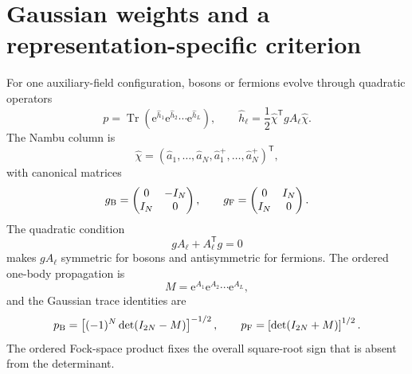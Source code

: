\documentclass[onecolumn,aps,prb,amsmath,amssymb,superscriptaddress,longbibliography]{revtex4-2}
\newcommand{\Tr}{\operatorname{Tr}}
\newcommand{\ee}{\mathrm{e}}
\newcommand{\trans}{\mathsf{T}}
\begin{document}
\section{Gaussian weights and a representation-specific criterion}

For one auxiliary-field configuration, bosons or fermions evolve through
quadratic operators
\begin{equation}
    p=\Tr\!\left(\ee^{\hat h_1}\ee^{\hat h_2}\cdots\ee^{\hat h_L}\right),
    \qquad
    \hat h_\ell=\frac12\hat\chi^\trans gA_\ell\hat\chi .
    \label{eq:configuration_weight}
\end{equation}
The Nambu column is
\begin{equation}
    \hat\chi=(\hat a_1,\ldots,\hat a_N,
    \hat a_1^+,\ldots,\hat a_N^+)^\trans ,
    \label{eq:nambu_column}
\end{equation}
with canonical matrices
\begin{equation}
    g_{\rm B}=\begin{pmatrix}0&-I_N\\ I_N&0\end{pmatrix},
    \qquad
    g_{\rm F}=\begin{pmatrix}0&I_N\\ I_N&0\end{pmatrix}.
    \label{eq:canonical_matrices}
\end{equation}
The quadratic condition
\begin{equation}
    gA_\ell+A_\ell^\trans g=0
    \label{eq:quadratic_condition}
\end{equation}
makes \(gA_\ell\) symmetric for bosons and antisymmetric for fermions.  The
ordered one-body propagation is
\begin{equation}
    M=\ee^{A_1}\ee^{A_2}\cdots\ee^{A_L},
    \label{eq:one_body_propagation}
\end{equation}
and the Gaussian trace identities are~\cite{munn1978ensemble,klich2014jstat}
\begin{equation}
    p_{\rm B}=\left[(-1)^N\det(I_{2N}-M)\right]^{-1/2},
    \qquad
    p_{\rm F}=\left[\det(I_{2N}+M)\right]^{1/2}.
    \label{eq:gaussian_trace_identities}
\end{equation}
The ordered Fock-space product fixes the overall square-root sign that is
absent from the determinant.
\end{document}
